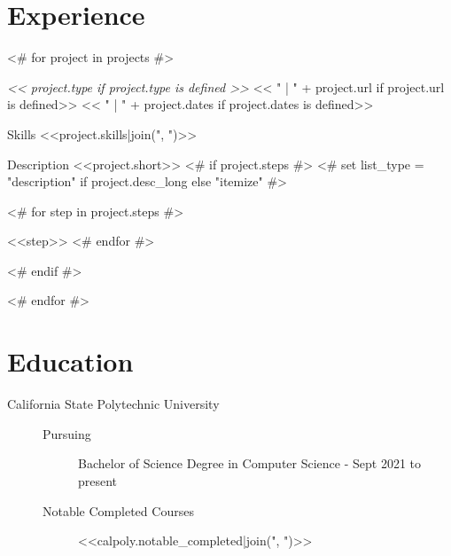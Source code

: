 \documentclass[a4paper,10pt]{extarticle}
\begin{document}

\section*{Experience}
\begin{description}
        <# for project in projects #>
    \item[<<project.name>>] \textit{<< project.type if project.type is defined >>} << " | " + project.url if project.url is defined>> << " | " + project.dates if project.dates is defined>>
        \begin{projects}
        \item [ Skills ] <<project.skills|join(", ")>>
        \item [ Description ] <<project.short>>
            <# if project.steps #>
            <# set list_type = "description" if project.desc_long else "itemize" #>
            \begin{<<list_type>>} %
                    <# for step in project.steps #>
                \item <<step>>
                    <# endfor #>
            \end{<<list_type>>}
            <# endif #>
        \end{projects}
        <# endfor #>
\end{description}

\section*{Education}
\begin{description}
    \item [ California State Polytechnic University ]\mbox{}
        \begin{description}
            \item [Pursuing] Bachelor of Science Degree in Computer Science - Sept 2021 to present
            \item [Notable Completed Courses] <<calpoly.notable_completed|join(", ")>>
        \end{description}
\end{description}
\end{document}
